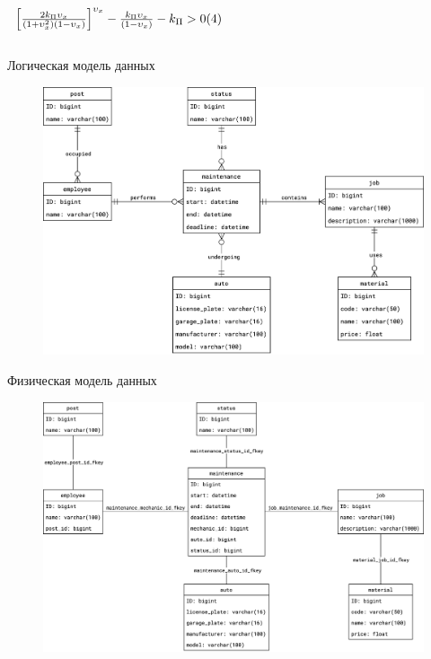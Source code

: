 \documentclass{beamer}
\begin{document}
\begin{frame}
\begin{columns}[c]
\begin{column}{0.56\linewidth}
{\begin{math}
\begin{array}{l}
        \left[
            \frac%
                { 2 k_\Pi \upsilon_x }%
                { \left( 1 + \upsilon^2_x \right) \left( 1 - \upsilon_x \right) }
        \right]^{ \upsilon_x }
        -
        \frac%
            { k_\Pi \upsilon_x }%
            { \left( 1 - \upsilon_x \right) }
        -
        k_\Pi > 0 \hfill (4)
    \end{array}
\end{math}
}
        \end{column}
    \end{columns}
\end{frame}

\begin{frame}
	{Логическая модель данных}
    \begin{figure}[H]
        \centering
        \includegraphics[keepaspectratio,width=\textwidth]{3/images/3_1_db_logical.png}
    \end{figure}
\end{frame}

\begin{frame}
	{Физическая модель данных}
    \begin{figure}[H]
        \centering
        \includegraphics[keepaspectratio,width=\textwidth]{3/images/3_1_db_physical.png}
    \end{figure}
\end{frame}
\end{document}
